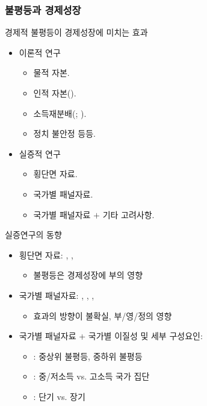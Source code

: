 \documentclass[aspectratio=169,xcolor=dvipsnames,handout]{beamer}
\begin{document}
\subsubsection{불평등과 경제성장}
\begin{frame}{경제적 불평등이 경제성장에 미치는 효과}
    \begin{itemize}
        \item 이론적 연구
        \begin{itemize}
            \item 물적 자본.
            \item 인적 자본(\cite{gnz93}).
            \item 소득재분배(\cite{anr94}; \cite{pnt94}).
            \item 정치 불안정 등등.
        \end{itemize}
        \item 실증적 연구
        \begin{itemize}
            \item 횡단면 자료.
            \item 국가별 패널자료.
            \item 국가별 패널자료 $+$ 기타 고려사항.
        \end{itemize}
    \end{itemize}
\end{frame}

\begin{frame}{실증연구의 동향}
    \begin{itemize}
        \item 횡단면 자료: \cite{barro91}, \cite{anr94}, \cite{pnt94}
        \begin{itemize}
            \item 불평등은 경제성장에 부의 영향
        \end{itemize}
        \item 국가별 패널자료: \cite{lnz98}, \cite{barro20}, \cite{forbes00}, \cite{bnd03}
        \begin{itemize}
            \item 효과의 방향이 불확실, 부/영/정의 영향
        \end{itemize}
        \item 국가별 패널자료 + 국가별 이질성 및 세부 구성요인:
        \begin{itemize}
            \item \cite{voit05, voit11}: 중상위 불평등, 중하위 불평등
            \item \cite{cc10}: 중/저소득 vs. 고소득 국가 집단
            \item \cite{hetl14}: 단기 vs. 장기
        \end{itemize}
    \end{itemize}
\end{frame}
\end{document}
